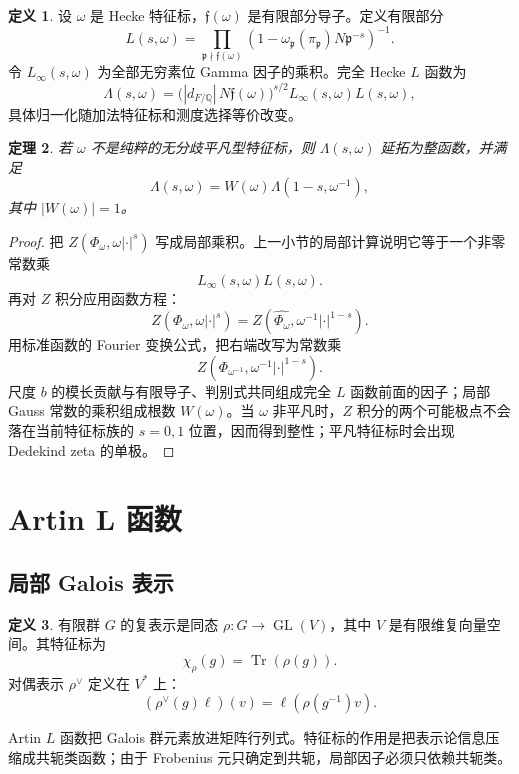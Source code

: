 \documentclass[11pt,a4paper,openany]{ctexbook}
\numberwithin{equation}{chapter}
\newcommand{\Q}{\mathbb{Q}}
\newcommand{\GL}{\operatorname{GL}}
\theoremstyle{plain}
\newtheorem{theorem}{定理}[chapter]
\theoremstyle{definition}
\newtheorem{definition}[theorem]{定义}
\theoremstyle{remark}
\begin{document}
\begin{definition}
设 $\omega$ 是 Hecke 特征标，$\mathfrak f(\omega)$ 是有限部分导子。定义有限部分
\[
  L(s,\omega)=\prod_{\mathfrak p\nmid\mathfrak f(\omega)}
  (1-\omega_{\mathfrak p}(\pi_{\mathfrak p})N\mathfrak p^{-s})^{-1}.
\]
令 $L_\infty(s,\omega)$ 为全部无穷素位 Gamma 因子的乘积。完全 Hecke $L$ 函数为
\[
  \Lambda(s,\omega)=
  \bigl(|d_{F/\Q}|\,N\mathfrak f(\omega)\bigr)^{s/2}
  L_\infty(s,\omega)L(s,\omega),
\]
具体归一化随加法特征标和测度选择等价改变。
\end{definition}

\begin{theorem}
若 $\omega$ 不是纯粹的无分歧平凡型特征标，则 $\Lambda(s,\omega)$ 延拓为整函数，并满足
\[
  \Lambda(s,\omega)=W(\omega)\Lambda(1-s,\omega^{-1}),
\]
其中 $|W(\omega)|=1$。
\end{theorem}

\begin{proof}
把 $Z(\Phi_\omega,\omega|\cdot|^s)$ 写成局部乘积。上一小节的局部计算说明它等于一个非零常数乘
\[
  L_\infty(s,\omega)L(s,\omega).
\]
再对 $Z$ 积分应用函数方程：
\[
  Z(\Phi_\omega,\omega|\cdot|^s)
  =
  Z(\widehat{\Phi_\omega},\omega^{-1}|\cdot|^{1-s}).
\]
用标准函数的 Fourier 变换公式，把右端改写为常数乘
\[
  Z(\Phi_{\omega^{-1}},\omega^{-1}|\cdot|^{1-s}).
\]
尺度 $b$ 的模长贡献与有限导子、判别式共同组成完全 $L$ 函数前面的因子；局部 Gauss 常数的乘积组成根数 $W(\omega)$。当 $\omega$ 非平凡时，$Z$ 积分的两个可能极点不会落在当前特征标族的 $s=0,1$ 位置，因而得到整性；平凡特征标时会出现 Dedekind zeta 的单极。
\end{proof}

\section{Artin L 函数}

\subsection{局部 Galois 表示}

\begin{definition}
有限群 $G$ 的复表示是同态 $\rho:G\to\GL(V)$，其中 $V$ 是有限维复向量空间。其特征标为
\[
  \chi_\rho(g)=\operatorname{Tr}(\rho(g)).
\]
对偶表示 $\rho^\vee$ 定义在 $V^\ast$ 上：
\[
  (\rho^\vee(g)\ell)(v)=\ell(\rho(g^{-1})v).
\]
\end{definition}

Artin $L$ 函数把 Galois 群元素放进矩阵行列式。特征标的作用是把表示论信息压缩成共轭类函数；由于 Frobenius 元只确定到共轭，局部因子必须只依赖共轭类。
\end{document}
